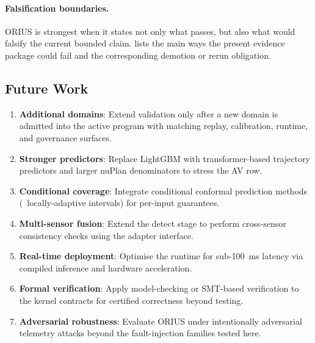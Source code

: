 
\paragraph{Falsification boundaries.}
ORIUS is strongest when it states not only what passes, but also what would falsify
the current bounded claim.   lists the main
ways the present evidence package could fail and the corresponding demotion or
rerun obligation.


\subsection{Future Work}

\begin{enumerate}[nosep]
  \item \textbf{Additional domains}: Extend validation only after a new domain is
        admitted into the active program with matching replay, calibration,
        runtime, and governance surfaces.
  \item \textbf{Stronger predictors}: Replace LightGBM with transformer-based
        trajectory predictors and larger nuPlan denominators to stress the AV row.
  \item \textbf{Conditional coverage}: Integrate conditional conformal prediction
        methods (\eg~locally-adaptive intervals) for per-input guarantees.
  \item \textbf{Multi-sensor fusion}: Extend the detect stage to perform
        cross-sensor consistency checks using the adapter interface.
  \item \textbf{Real-time deployment}: Optimise the runtime for sub-100~ms latency
        via compiled inference and hardware acceleration.
  \item \textbf{Formal verification}: Apply model-checking or SMT-based verification
        to the kernel contracts for certified correctness beyond testing.
  \item \textbf{Adversarial robustness}: Evaluate ORIUS under intentionally
        adversarial telemetry attacks beyond the fault-injection families tested here.
\end{enumerate}
